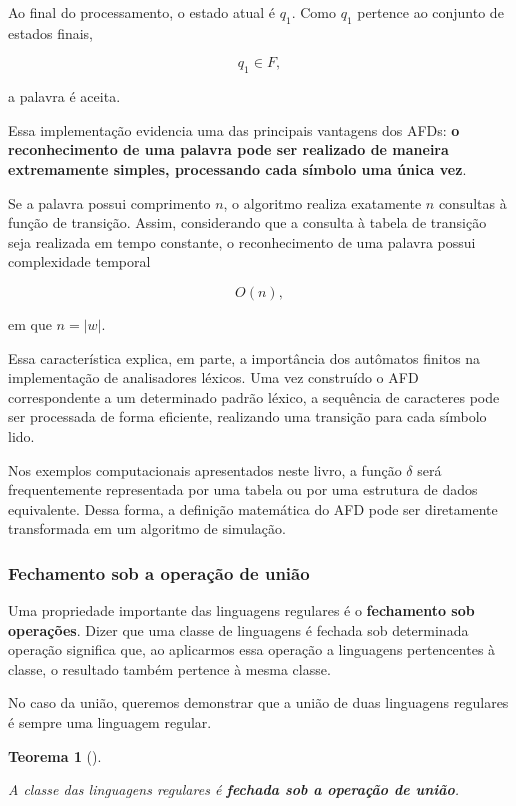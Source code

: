 \documentclass[
  brazilian,
  letterpaper,
]{book}
\theoremstyle{plain}
\newtheorem{theorem}{Teorema}[chapter]
\theoremstyle{definition}
\theoremstyle{remark}
\begin{document}
Ao final do processamento, o estado atual é \(q_1\). Como \(q_1\)
pertence ao conjunto de estados finais,

\[
q_1\in F,
\]

a palavra é aceita.

Essa implementação evidencia uma das principais vantagens dos AFDs:
\textbf{o reconhecimento de uma palavra pode ser realizado de maneira
extremamente simples, processando cada símbolo uma única vez}.

Se a palavra possui comprimento \(n\), o algoritmo realiza exatamente
\(n\) consultas à função de transição. Assim, considerando que a
consulta à tabela de transição seja realizada em tempo constante, o
reconhecimento de uma palavra possui complexidade temporal

\[
O(n),
\]

em que \(n=|w|\).

Essa característica explica, em parte, a importância dos autômatos
finitos na implementação de analisadores léxicos. Uma vez construído o
AFD correspondente a um determinado padrão léxico, a sequência de
caracteres pode ser processada de forma eficiente, realizando uma
transição para cada símbolo lido.

Nos exemplos computacionais apresentados neste livro, a função
\(\delta\) será frequentemente representada por uma tabela ou por uma
estrutura de dados equivalente. Dessa forma, a definição matemática do
AFD pode ser diretamente transformada em um algoritmo de simulação.

\subsubsection{Fechamento sob a operação de
união}\label{sec-fechamento-uniao}

Uma propriedade importante das linguagens regulares é o
\textbf{fechamento sob operações}. Dizer que uma classe de linguagens é
fechada sob determinada operação significa que, ao aplicarmos essa
operação a linguagens pertencentes à classe, o resultado também pertence
à mesma classe.

No caso da união, queremos demonstrar que a união de duas linguagens
regulares é sempre uma linguagem regular.

\begin{theorem}[]\protect\hypertarget{thm-fechamento-uniao}{}\label{thm-fechamento-uniao}

A classe das linguagens regulares é \textbf{fechada sob a operação de
união}.

\end{theorem}
\end{document}

